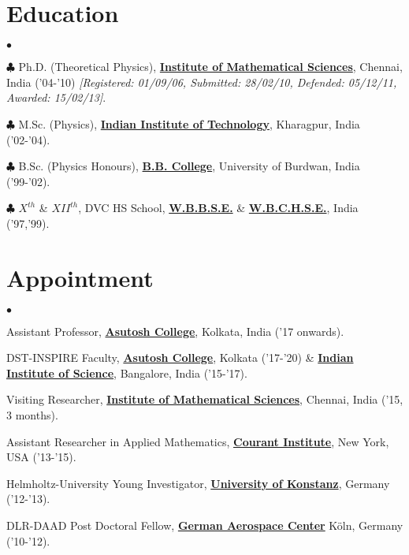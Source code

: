 \documentclass[margin,line]{res}
\newenvironment{list2}{
  \begin{list}{$\bullet$}{%
      \setlength{\itemsep}{0in}
      \setlength{\parsep}{0in} \setlength{\parskip}{0in}
      \setlength{\topsep}{0in} \setlength{\partopsep}{0in} 
      \setlength{\leftmargin}{0.2in}}}{\end{list}}
\begin{document}
\begin{resume}
\section{\sc Education}
\begin{list2}
\item[$\clubsuit$] Ph.D. (Theoretical Physics), {\bf \href{http://www.imsc.res.in/}{Institute of Mathematical Sciences}}, Chennai, India ('04-'10) 
{\it [Registered: 01/09/06, Submitted: 28/02/10, Defended: 05/12/11, Awarded: 15/02/13]}.
\item[$\clubsuit$] M.Sc. (Physics), {\bf \href{http://www.iitkgp.ac.in/}{Indian Institute of Technology}}, Kharagpur, India ('02-'04). 
\item[$\clubsuit$] B.Sc. (Physics Honours), {\bf \href{http://www.bbcollege.ac.in/}{B.B. College}}, University of Burdwan, India ('99-'02).
\item[$\clubsuit$] $X^{th}$ \& $XII^{th}$, DVC HS School, {\bf \href{https://wbbse.wb.gov.in}{W.B.B.S.E.}} \& {\bf \href{https://wbchse.wb.gov.in/}{W.B.C.H.S.E.}}, India ('97,'99).
\end{list2}
\vspace{1mm}

\section{\sc Appointment}
\begin{list2}
\item Assistant Professor, {\bf \href{https://asutoshcollege.in/new-web/}{Asutosh College}}, Kolkata, India ('17 onwards). 
\item DST-INSPIRE Faculty, {\bf \href{https://asutoshcollege.in/new-web/}{Asutosh College}}, Kolkata ('17-'20) \& 
                           {\bf \href{http://www.physics.iisc.ac.in/}{Indian Institute of Science}}, Bangalore, India ('15-'17).
\item Visiting Researcher, {\bf \href{https://www.imsc.res.in/}{Institute of Mathematical Sciences}}, Chennai, India ('15, 3 months).
\item Assistant Researcher in {\sf Applied Mathematics}, {\bf \href{http://cims.nyu.edu/}{Courant Institute}}, New York, USA ('13-'15).
\item Helmholtz-University Young Investigator, {\bf \href{http://www.uni-konstanz.de/en/welcome/}{University of Konstanz}}, Germany ('12-'13).
\item DLR-DAAD Post Doctoral Fellow, {\bf \href{http://www.dlr.de/mp/en/}{German Aerospace Center}} K\"{o}ln, Germany ('10-'12).
\end{list2}
\vspace{1mm}


\end{resume}
\end{document}
